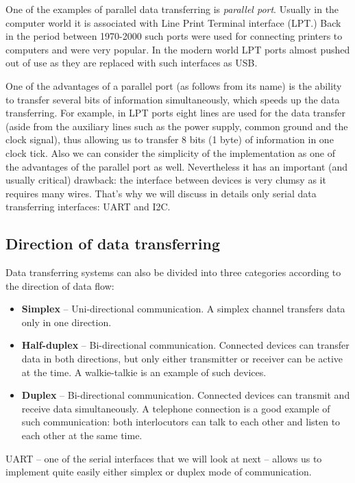 \documentclass[../sparc.tex]{subfiles}
\begin{document}
One of the examples of parallel data transferring is \emph{parallel port}.
Usually in the computer world it is associated with Line Print Terminal
interface (\gls{LPT}.)  Back in the period between 1970-2000 such ports were
used for connecting printers to computers and were very popular.  In the modern
world LPT ports almost pushed out of use as they are replaced with such
interfaces as USB.

One of the advantages of a parallel port (as follows from its name) is the
ability to transfer several bits of information simultaneously, which speeds up
the data transferring.  For example, in LPT ports eight lines are used for the
data transfer (aside from the auxiliary lines such as the power supply, common
ground and the clock signal), thus allowing us to transfer 8 bits (1 byte) of
information in one clock tick.  Also we can consider the simplicity of the
implementation as one of the advantages of the parallel port as well.
Nevertheless it has an important (and usually critical) drawback: the interface
between devices is very clumsy as it requires many wires.  That's why we will
discuss in details only serial data transferring interfaces: \gls{UART} and I2C.


\subsection{Direction of data transferring}

Data transferring systems can also be divided into three categories according to
the direction of data flow:

\begin{itemize}
\item \textbf{Simplex} -- Uni-directional communication.  A simplex channel
  transfers data only in one direction.
\item \textbf{Half-duplex} -- Bi-directional communication.  Connected devices
  can transfer data in both directions, but only either transmitter or receiver
  can be active at the time.  A walkie-talkie is an example of such devices.
\item \textbf{Duplex} -- Bi-directional communication.  Connected devices can
  transmit and receive data simultaneously.  A telephone connection is a good
  example of such communication: both interlocutors can talk to each other and
  listen to each other at the same time.
\end{itemize}

\gls{UART} -- one of the serial interfaces that we will look at next -- allows us
to implement quite easily either simplex or duplex mode of communication.
\end{document}
